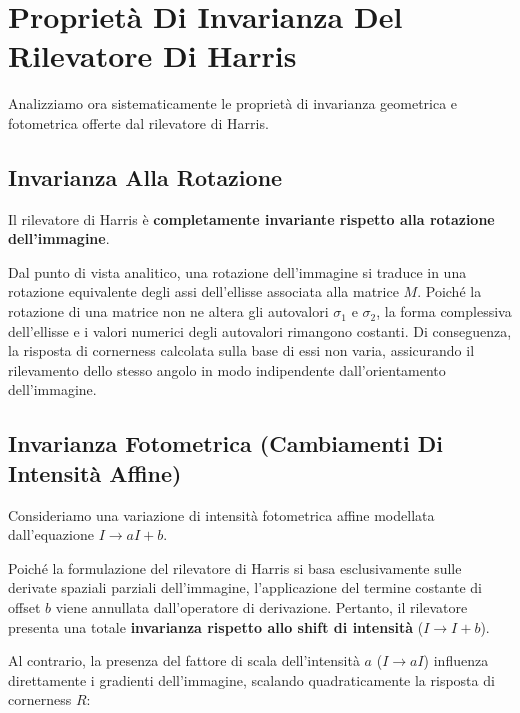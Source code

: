 ﻿\documentclass[11pt, a4paper]{article}
\begin{document}
\newpage

\section{Proprietà Di Invarianza Del Rilevatore Di Harris}

Analizziamo ora sistematicamente le proprietà di invarianza geometrica e fotometrica offerte dal rilevatore di Harris.

\subsection{Invarianza Alla Rotazione}

Il rilevatore di Harris è \textbf{completamente invariante rispetto alla rotazione dell'immagine}.


Dal punto di vista analitico, una rotazione dell'immagine si traduce in una rotazione equivalente degli assi dell'ellisse associata alla matrice $M$. Poiché la rotazione di una matrice non ne altera gli autovalori $\sigma_1$ e $\sigma_2$, la forma complessiva dell'ellisse e i valori numerici degli autovalori rimangono costanti. Di conseguenza, la risposta di cornerness calcolata sulla base di essi non varia, assicurando il rilevamento dello stesso angolo in modo indipendente dall'orientamento dell'immagine.

\subsection{Invarianza Fotometrica (Cambiamenti Di Intensità Affine)}

Consideriamo una variazione di intensità fotometrica affine modellata dall'equazione $I \to aI + b$.

Poiché la formulazione del rilevatore di Harris si basa esclusivamente sulle derivate spaziali parziali dell'immagine, l'applicazione del termine costante di offset $b$ viene annullata dall'operatore di derivazione. Pertanto, il rilevatore presenta una totale \textbf{invarianza rispetto allo shift di intensità} ($I \to I + b$).

Al contrario, la presenza del fattore di scala dell'intensità $a$ ($I \to aI$) influenza direttamente i gradienti dell'immagine, scalando quadraticamente la risposta di cornerness $R$:
\end{document}
